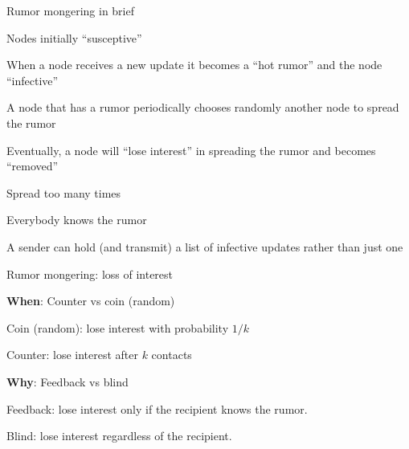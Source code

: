 \begin{frame}{Rumor mongering in brief}
	
\BIL
\item Nodes initially “susceptive”
\item When a node receives a new update it becomes a “hot rumor” and the node “infective”
\item A node that has a rumor periodically chooses randomly another node to spread the rumor
\item Eventually, a node will “lose interest” in spreading the rumor and becomes “removed”
\BI
 \item Spread too many times
 \item Everybody knows the rumor
\EI
\item A sender can hold (and transmit) a list of infective updates rather than just one
\EIL

\end{frame}

\begin{frame}{Rumor mongering: loss of interest }

\BIL
\item \textbf{When}: Counter vs coin (random)
\BI
\item \alert{Coin} (\alert{random}): lose interest with probability $1/k$
\item \alert{Counter}: lose interest after $k$ contacts
\EI
\item \textbf{Why}: Feedback vs blind
\BI
\item \alert{Feedback}: lose interest only if the recipient knows the rumor.
\item \alert{Blind}: lose interest regardless of the recipient.
\EI
\EIL
\end{frame}

